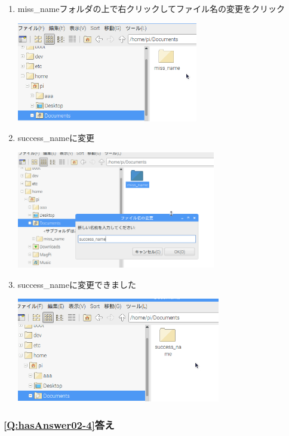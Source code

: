 \documentclass[a4paper,12pt]{jarticle}
\begin{document}
\begin{enumerate}
  \item
        miss\_nameフォルダの上で右クリックしてファイル名の変更をクリック

        \centering
        \includegraphics[width=7.913cm,height=4.344cm]{textbook-img214.png}
        \flushleft

  \item success\_nameに変更

        \centering
        \includegraphics[width=8.694cm,height=5.115cm]{textbook-img215.png}
        \flushleft
  \item success\_nameに変更できました

        \centering
        \includegraphics[width=8.895cm,height=4.542cm]{textbook-img216.png}
        \flushleft
\end{enumerate}



\subsubsection{\bfseries
\ref*{Q:hasAnswer02-4}答え}
\end{document}
